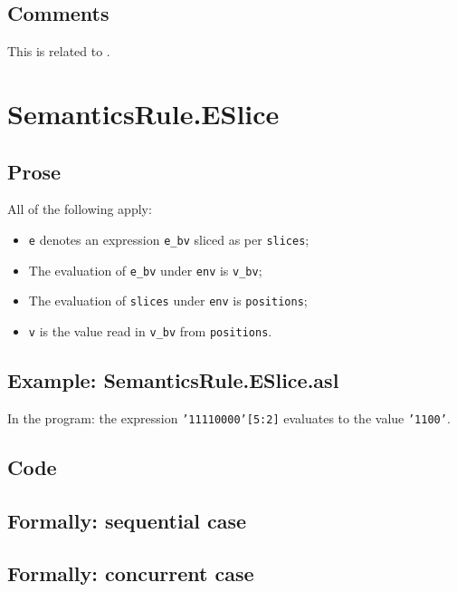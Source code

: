 \documentclass{book}
\begin{document}
  \subsection{Comments}
  This is related to .

\section{SemanticsRule.ESlice \label{sec:SemanticsRule.ESlice}}

  \subsection{Prose}
  All of the following apply:
  \begin{itemize}
  \item \texttt{e} denotes an expression \texttt{e\_bv} sliced as per \texttt{slices};
  \item The evaluation of \texttt{e\_bv} under \texttt{env} is \texttt{v\_bv};
  \item The evaluation of \texttt{slices} under \texttt{env} is \texttt{positions};
  \item \texttt{v} is the value read in \texttt{v\_bv} from \texttt{positions}.
  \end{itemize}

  \subsection{Example: SemanticsRule.ESlice.asl}
    In the program:
    the expression \texttt{'11110000'[5:2]} evaluates to the value \texttt{'1100'}.

  \subsection{Code}

\begin{emptyformal}
  \subsection{Formally: sequential case}

  \subsection{Formally: concurrent case}
\end{emptyformal}
\end{document}
